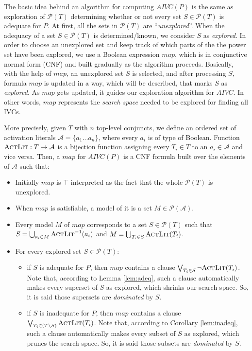The basic idea behind an algorithm for computing $AIVC(P)$ is the same as exploration of $\mathcal{P}(T)$ determining whether or not every set $S \in \mathcal{P}(T)$ is adequate for $P$.
At first, all the sets in $\mathcal{P}(T)$ are ``\emph{unexplored}''. When the adequacy of a set $S \in \mathcal{P}(T)$ is determined/known, we consider $S$ as \emph{explored}.
In order to choose an unexplored set and keep track of which parts of the the power set
have been explored, we use a Boolean expression $map$, which is
in conjunctive normal form (CNF) and built gradually as the algorithm proceeds.
Basically, with the help of $map$, an unexplored set $S$ is selected, and after processing $S$,
formula $map$ is updated in a way, which will be described, that marks $S$ as \emph{explored}.
As $map$ gets updated, it guides our exploration algorithm for $AIVC$.
In other words, $map$ represents the \emph{search space} needed to be explored for finding all IVCs.

More precisely, given $T$ with $n$ top-level conjuncts,
we define an ordered
set of activation literals $\mathcal{A} = \{a_1...a_n\}$, where every $a_i$ is of type of Boolean. Function $\textsc{ActLit} : T \rightarrow \mathcal{A}$
is a bijection function assigning every $T_i \in T$ to an $a_i \in \mathcal{A}$ and vice versa.
Then, a $map$ for $AIVC(P)$ is a CNF formula built over the elements of $\mathcal{A}$ such that:
\begin{itemize}
  \item Initially $map$ is $\top$ interpreted as the fact that the whole $\mathcal{P}(T)$ is unexplored.
  \item When $map$ is satisfiable, a model of it is a set
  $M \in \mathcal{P}(\mathcal{A})$.
  \item Every model $M$ of $map$ corresponds to a set $S \in \mathcal{P}(T)$ such that
$S = \bigcup_{a_i \in M} \textsc{ActLit} ^{-1} (a_i)$ and $M = \bigcup_{T_i \in S} \textsc{ActLit}(T_i)$.
  \item For every explored set $S \in \mathcal{P}(T)$:
  \begin{itemize}
    \item if $S$ is adequate for $P$, then $map$ contains a clause $\bigvee_{T_{i}\in S} \neg {\textsc{ActLit}(T_i)}$. Note that, according to Lemma \ref{lem:adeq}, such a clause automatically makes every superset of $S$ as explored, which shrinks our search space. So, it is said those supersets are \emph{dominated} by $S$.
    \item if $S$ is inadequate for $P$, then $map$ contains a clause $\bigvee_{T_{i}\in (T \setminus S)} \textsc{ActLit} (T_i)$. Note that, according to Corollary \ref{lem:inadeq}, such a clause automatically makes every subset of $S$ as explored, which prunes the search space. So, it is said those subsets are \emph{dominated} by $S$.
  \end{itemize}
\end{itemize}



